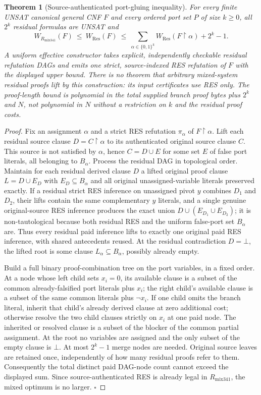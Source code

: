 \documentclass[11pt]{article}
\newtheorem{theorem}{Theorem}
\begin{document}
\begin{theorem}[Source-authenticated port-gluing inequality]
\label{thm:glue}
For every finite UNSAT canonical general CNF $F$ and every ordered port set $P$ of size $k\ge0$, all $2^k$ residual formulas are UNSAT and
\[
\boxed{W_{R_{\mathrm{mix341}}}(F)\ \le\ W_{\mathrm{Res}}(F)
\ \le\ \sum_{\alpha\in\{0,1\}^k}W_{\mathrm{Res}}(F\upharpoonright\alpha)+2^k-1.}
\]
A uniform effective constructor takes \emph{explicit}, independently checkable residual refutation DAGs and emits one strict, source-indexed RES refutation of $F$ with the displayed upper bound. There is no theorem that arbitrary mixed-system residual proofs lift by this construction: its input certificates use RES only. The proof-length bound is polynomial in the total \emph{supplied} branch proof bytes plus $2^k$ and $N$, not polynomial in $N$ without a restriction on $k$ and the residual proof costs.
\end{theorem}
\begin{proof}
Fix an assignment $\alpha$ and a strict RES refutation $\pi_\alpha$ of $F\upharpoonright\alpha$. Lift each residual source clause $D=C\upharpoonright\alpha$ to its authenticated original source clause $C$. This source is not satisfied by $\alpha$, hence $C=D\cup E$ for some set $E$ of false port literals, all belonging to $B_\alpha$. Process the residual DAG in topological order. Maintain for each residual derived clause $D$ a lifted original proof clause $L=D\cup E_D$ with $E_D\subseteq B_\alpha$ and all original unassigned-variable literals preserved exactly. If a residual strict RES inference on unassigned pivot $y$ combines $D_1$ and $D_2$, their lifts contain the same complementary $y$ literals, and a single genuine original-source RES inference produces the exact union $D\cup(E_{D_1}\cup E_{D_2})$; it is non-tautological because both residual RES and the uniform false-port set $B_\alpha$ are. Thus every residual paid inference lifts to exactly one original paid RES inference, with shared antecedents reused. At the residual contradiction $D=\bot$, the lifted root is some clause $L_\alpha\subseteq B_\alpha$, possibly already empty.

Build a full binary proof-combination tree on the port variables, in a fixed order. At a node whose left child sets $x_i=0$, its available clause is a subset of the common already-falsified port literals plus $x_i$; the right child's available clause is a subset of the same common literals plus $\neg x_i$. If one child omits the branch literal, inherit that child's already derived clause at zero additional cost; otherwise resolve the two child clauses strictly on $x_i$ at one paid node. The inherited or resolved clause is a subset of the blocker of the common partial assignment. At the root no variables are assigned and the only subset of the empty clause is $\bot$. At most $2^k-1$ merge nodes are needed. Original source leaves are retained once, independently of how many residual proofs refer to them. Consequently the total distinct paid DAG-node count cannot exceed the displayed sum. Since source-authenticated RES is already legal in $R_{\mathrm{mix341}}$, the mixed optimum is no larger. \hfill$\square$
\end{proof}
\end{document}
